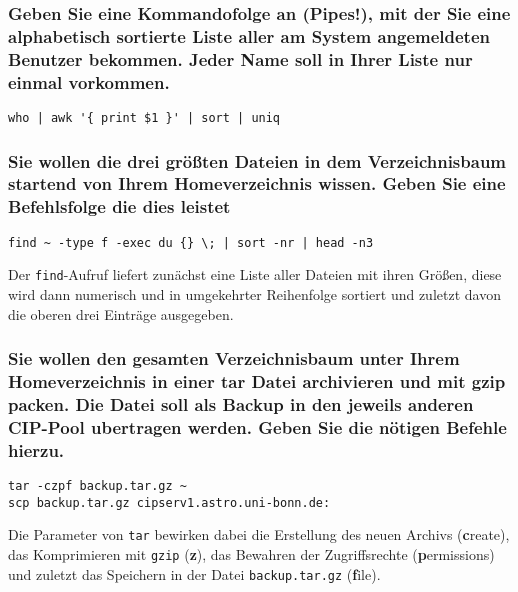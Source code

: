 \subsubsection*{Geben Sie eine Kommandofolge an (Pipes!), mit der Sie eine
alphabetisch sortierte Liste aller am System angemeldeten Benutzer bekommen.
Jeder Name soll in Ihrer Liste nur einmal vorkommen.}
\begin{lstlisting}
who | awk '{ print $1 }' | sort | uniq
\end{lstlisting}

\subsubsection*{Sie wollen die drei größten Dateien in dem Verzeichnisbaum
startend von Ihrem Homeverzeichnis wissen. Geben Sie eine Befehlsfolge die dies
leistet}
\begin{lstlisting}
find ~ -type f -exec du {} \; | sort -nr | head -n3
\end{lstlisting}
Der \lstinline'find'-Aufruf liefert zunächst eine Liste aller Dateien mit ihren
Größen, diese wird dann numerisch und in umgekehrter Reihenfolge sortiert und
zuletzt davon die oberen drei Einträge ausgegeben.

\subsubsection*{Sie wollen den gesamten Verzeichnisbaum unter Ihrem
Homeverzeichnis in einer tar Datei archivieren und mit gzip packen. Die Datei
soll als Backup in den jeweils anderen CIP-Pool ubertragen werden. Geben Sie die
nötigen Befehle hierzu.}
\begin{lstlisting}
tar -czpf backup.tar.gz ~
scp backup.tar.gz cipserv1.astro.uni-bonn.de:
\end{lstlisting}
Die Parameter von \lstinline'tar' bewirken dabei die Erstellung des neuen
Archivs (\textbf create), das Komprimieren mit \lstinline'gzip' (\textbf z), das
Bewahren der Zugriffsrechte (\textbf permissions) und zuletzt das Speichern in
der Datei \lstinline'backup.tar.gz' (\textbf file).


